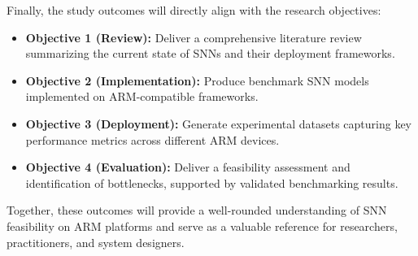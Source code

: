 \documentclass[a4paper,12pt]{article}
\begin{document}
	Finally, the study outcomes will directly align with the research objectives:
	\begin{itemize}
		\item \textbf{Objective 1 (Review):} Deliver a comprehensive literature review summarizing the current state of SNNs and their deployment frameworks.
		\item \textbf{Objective 2 (Implementation):} Produce benchmark SNN models implemented on ARM-compatible frameworks.
		\item \textbf{Objective 3 (Deployment):} Generate experimental datasets capturing key performance metrics across different ARM devices.
		\item \textbf{Objective 4 (Evaluation):} Deliver a feasibility assessment and identification of bottlenecks, supported by validated benchmarking results.
	\end{itemize}
	Together, these outcomes will provide a well-rounded understanding of SNN feasibility on ARM platforms and serve as a valuable reference for researchers, practitioners, and system designers.
	
	
	
\end{document}
